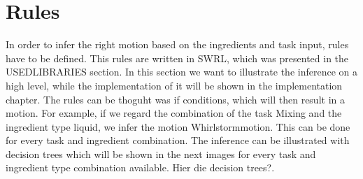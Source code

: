 \section*{Rules}
In order to infer the right motion based on the ingredients and task input, rules have to be defined. This rules are written in SWRL, which was presented in the USEDLIBRARIES section. In this section we want to illustrate the inference on a high level, while the implementation of it will be shown in the implementation chapter. 
The rules can be thoguht was if conditions, which will then result in a motion. For example, if we regard the combination of the task Mixing and the ingredient type liquid, we infer the motion Whirlstormmotion. This can be done for every task and ingredient combination. 
The inference can be illustrated with decision trees which will be shown in the next images for every task and ingredient type combination available. 
Hier die decision trees?. 